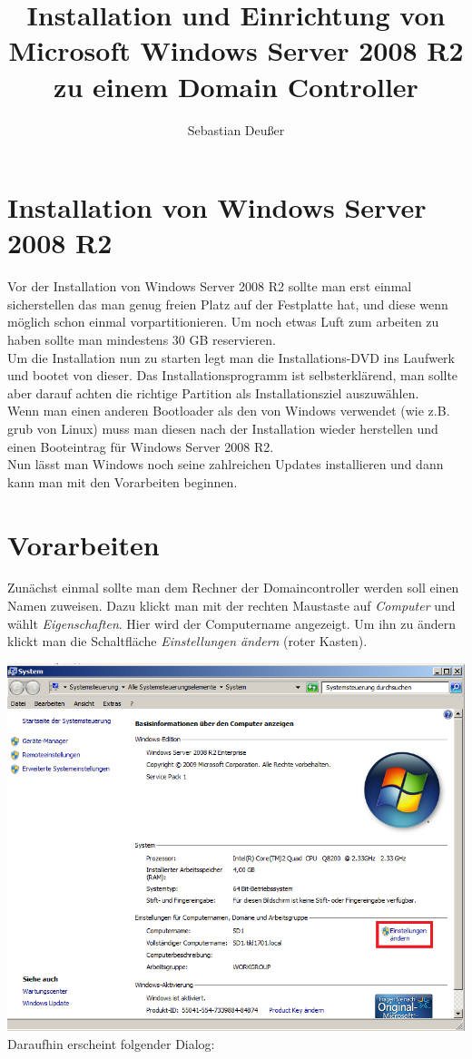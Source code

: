 \documentclass[12pt,a4paper,titlepage]{article} %
\title{Installation und Einrichtung von Microsoft Windows Server 2008 R2 zu einem Domain Controller}
\author{Sebastian Deußer}
\begin{document}
\maketitle %

\tableofcontents

\newpage
\pagestyle{headings}
\section{Installation von Windows Server 2008 R2}
Vor der Installation von Windows Server 2008 R2 sollte man erst einmal sicherstellen das man genug freien Platz auf der Festplatte hat, und diese wenn möglich schon einmal vorpartitionieren. Um noch etwas Luft zum arbeiten zu haben sollte man mindestens 30 GB reservieren.\\
Um die Installation nun zu starten legt man die Installations-DVD ins Laufwerk und bootet von dieser. Das Installationsprogramm ist selbsterklärend, man sollte aber darauf achten die richtige Partition als Installationsziel auszuwählen.\\
Wenn man einen anderen Bootloader als den von Windows verwendet (wie z.B. grub von Linux) muss man diesen nach der Installation wieder herstellen und einen Booteintrag für Windows Server 2008 R2.\\
Nun lässt man Windows noch seine zahlreichen Updates installieren und dann kann man mit den Vorarbeiten beginnen.

\newpage
\section{Vorarbeiten}
Zunächst einmal sollte man dem Rechner der Domaincontroller werden soll einen Namen zuweisen. Dazu klickt man mit der rechten Maustaste auf \emph{Computer} und wählt \emph{Eigenschaften}. Hier wird der Computername angezeigt. Um ihn zu ändern klickt man die Schaltfläche \emph{Einstellungen ändern} (roter Kasten).

\includegraphics[width=14cm]{Bilder/001(Kasten)}\\
\newpage
Daraufhin erscheint folgender Dialog:
\end{document}
